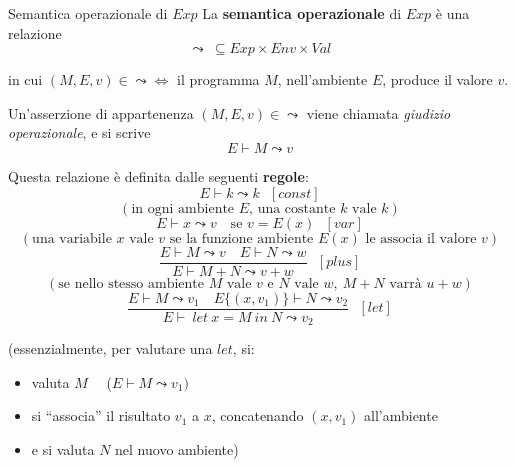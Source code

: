 \documentclass[a4paper,11pt]{report}
\begin{document}
\begin{defbox}{Semantica operazionale di \( Exp \)}{}
    La \textbf{semantica operazionale} di \( Exp \) è una relazione
    \[ \leadsto \ \subseteq Exp \times Env \times Val\]

    in cui \( (M, E, v) \in \leadsto \iff \) il programma \( M \), nell'ambiente \( E \), produce il valore \( v \).

    \vspace{0.5em}

    Un'asserzione di appartenenza \( (M, E, v) \in \leadsto\) viene chiamata \textit{giudizio operazionale}, e si scrive
    \[ E \vdash M \leadsto v \]


    Questa relazione è definita dalle seguenti \textbf{regole}:
    \[ E \vdash k \leadsto k  \ \ \ [ const ] \] 
    \vspace{-1.5em}
    {\small\color{gray}\[ (\text{in ogni ambiente } E \text{, una costante } k \text{ vale } k )\]}
    \vspace{-1em}
    \[ E \vdash x \leadsto v  \ \ \ \text{ se }  v = E(x) \ \ \ [ var ] \]
    \vspace{-1.5em}
    {\small\color{gray}\[ (\text{una variabile } x \text{ vale } v \text{ se la funzione ambiente } E(x) \text{ le associa il valore } v )\]}
    \vspace{-0.5em}
    \[
        \frac{
            E \vdash M \leadsto v \quad E \vdash N \leadsto w
        }{
            E \vdash M + N \leadsto v + w
        }
        \ \ \ [plus]
    \]
    {\small\color{gray}\[ (\text{se nello stesso ambiente } M \text{ vale } v \text{ e } N \text{ vale } w, \ M+N \text{ varrà } u+w)\]}
    \vspace{-0.5em}
    \[
        \frac{
            E \vdash M \leadsto v_1 \quad E\{(x, v_1)\} \vdash N \leadsto v_2
        }{
            E \vdash \ let \ x = M \ in \ N \leadsto v_2
        }
        \ \ \  [let]
    \]

    {\color{gray}(essenzialmente, per valutare una \( let \), si:
        \begin{itemize}
            \item valuta \( M\) \ \ (\( E \vdash M \leadsto v_1) \)
            \item si ``associa'' il risultato \( v_1 \) a \( x \), concatenando \( (x, v_1) \) all'ambiente
            \item e si valuta \( N \) nel nuovo ambiente)
    \end{itemize} }
\end{defbox}
\end{document}
